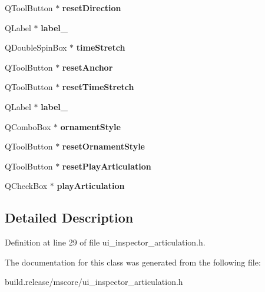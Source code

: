 \begin{DoxyCompactItemize}
Q\+Tool\+Button $\ast$ {\bfseries reset\+Direction}
\item 
\mbox{\label{class_ui___inspector_articulation_a121f2275099f9b2765dbc0d0beee9e3e}} 
Q\+Label $\ast$ {\bfseries label\+\_}
\item 
\mbox{\label{class_ui___inspector_articulation_a995de66de1ce66bad193b60568987a6e}} 
Q\+Double\+Spin\+Box $\ast$ {\bfseries time\+Stretch}
\item 
\mbox{\label{class_ui___inspector_articulation_ae994f33a4514555b386e911314f222e8}} 
Q\+Tool\+Button $\ast$ {\bfseries reset\+Anchor}
\item 
\mbox{\label{class_ui___inspector_articulation_a108b03d880ff8671a33d78d3271124a3}} 
Q\+Tool\+Button $\ast$ {\bfseries reset\+Time\+Stretch}
\item 
\mbox{\label{class_ui___inspector_articulation_a6b8da2af05962dc16a384656d6d16f37}} 
Q\+Label $\ast$ {\bfseries label\+\_}
\item 
\mbox{\label{class_ui___inspector_articulation_a84c1727671a05914a82ce1ff581220de}} 
Q\+Combo\+Box $\ast$ {\bfseries ornament\+Style}
\item 
\mbox{\label{class_ui___inspector_articulation_a3d928cd5169387b46f56b8ac3088808d}} 
Q\+Tool\+Button $\ast$ {\bfseries reset\+Ornament\+Style}
\item 
\mbox{\label{class_ui___inspector_articulation_aa652859763d3f739a040b0d7dab6cac0}} 
Q\+Tool\+Button $\ast$ {\bfseries reset\+Play\+Articulation}
\item 
\mbox{\label{class_ui___inspector_articulation_ad5c0b1fe117959900ac28309bdd40b20}} 
Q\+Check\+Box $\ast$ {\bfseries play\+Articulation}
\end{DoxyCompactItemize}


\subsection{Detailed Description}


Definition at line 29 of file ui\+\_\+inspector\+\_\+articulation.\+h.



The documentation for this class was generated from the following file\+:\begin{DoxyCompactItemize}
\item 
build.\+release/mscore/ui\+\_\+inspector\+\_\+articulation.\+h\end{DoxyCompactItemize}

